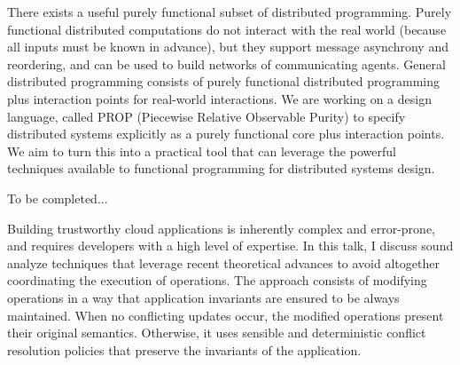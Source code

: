 \documentclass[a4paper,UKenglish]{dagrep-v2018}
\begin{document}

\license

There exists a useful purely functional subset of distributed programming.  Purely functional distributed computations do not interact with the real world (because all inputs must be known in advance), but they support message asynchrony and reordering, and can be used to build networks of communicating agents.  General distributed programming consists of purely functional distributed programming plus interaction points for real-world interactions.  We are working on a design language, called PROP (Piecewise Relative Observable Purity) to specify distributed systems explicitly as a purely functional core plus interaction points.  We aim to turn this into a practical tool that can leverage the powerful techniques available to functional programming for distributed systems design.


\license

To be completed...


\license

Building trustworthy cloud applications is inherently complex and error-prone, and requires developers with a high level of expertise. In this talk, I discuss sound analyze techniques that leverage recent theoretical advances to avoid altogether coordinating the execution of operations. The approach consists of modifying operations in a way that application invariants are ensured to be always maintained. When no conflicting updates occur, the modified operations present their original semantics. Otherwise, it uses sensible and deterministic conflict resolution policies that preserve the invariants of the application.

\end{document}
